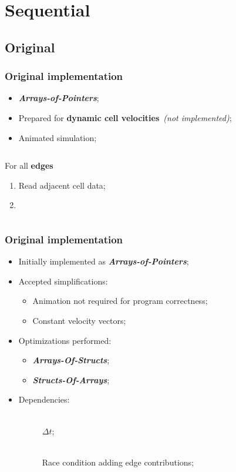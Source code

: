 \section{Sequential}

\subsection{Original}
\begin{frame}
	\frametitle{Original implementation}
	\begin{itemize}
		\item \textbf{\itshape Arrays-of-Pointers};
		\item Prepared for \textbf{dynamic cell velocities}\ \textit{(not implemented)};
		\item Animated simulation;
	\end{itemize}

	\begin{columns}
		\smaller
		\begin{block}{\computeflux}
			For all \textbf{edges}
			\begin{enumerate}
				\item Read adjacent cell data;	
				\item 
			\end{enumerate}
		\end{block}

		\begin{block}{\update}
		\end{block}
	\end{columns}
\end{frame}

\begin{frame}
	\frametitle{Original implementation}
	\begin{itemize}
		\vfill
		\item Initially implemented as \textbf{\itshape Arrays-of-Pointers};
		\vfill
		\item Accepted simplifications:
		\begin{itemize}
			\item Animation not required for program correctness;
			\item Constant velocity vectors;
		\end{itemize}
		\vfill
		\item Optimizations performed:
		\begin{itemize}
			\item \textbf{\itshape Arrays-Of-Structs};
			\item \textbf{\itshape Structs-Of-Arrays};
		\end{itemize}
		\vfill
		\item Dependencies:
		\begin{description}
			\item [\computeflux\hfill] \ \\$\Delta t$;
			\item [\update\hfill] \ \\Race condition adding edge contributions;
		\end{description}
		\vfill
	\end{itemize}
\end{frame}
